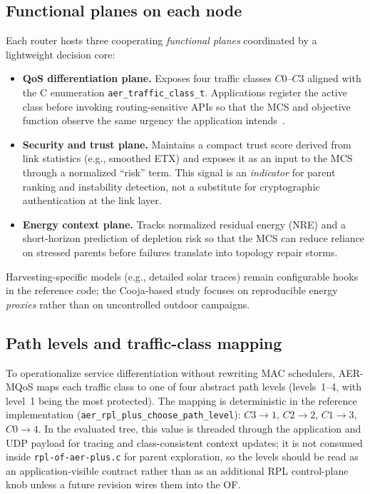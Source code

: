 \subsection{Functional planes on each node}
Each router hosts three cooperating \emph{functional planes} coordinated by a lightweight decision core:
\begingroup\sloppy
\begin{itemize}
  \item \textbf{QoS differentiation plane.} Exposes four traffic classes $C0$--$C3$ aligned with the C enumeration \texttt{aer\_traffic\_class\_t}. Applications register the active class before invoking routing-sensitive APIs so that the MCS and objective function observe the same urgency the application intends~\cite{rfc6551}.
  \item \textbf{Security and trust plane.} Maintains a compact trust score derived from link statistics (e.g., smoothed ETX) and exposes it as an input to the MCS through a normalized ``risk'' term. This signal is an \emph{indicator} for parent ranking and instability detection, not a substitute for cryptographic authentication at the link layer.
  \item \textbf{Energy context plane.} Tracks normalized residual energy (NRE) and a short-horizon prediction of depletion risk so that the MCS can reduce reliance on stressed parents before failures translate into topology repair storms.
\end{itemize}
\endgroup
Harvesting-specific models (e.g., detailed solar traces) remain configurable hooks in the reference code; the Cooja-based study focuses on reproducible energy \emph{proxies} rather than on uncontrolled outdoor campaigns.

\subsection{Path levels and traffic-class mapping}
\label{sec:arch-pathlevels}
To operationalize service differentiation without rewriting MAC schedulers, AER-MQoS maps each traffic class to one of four abstract path levels (levels~1--4, with level~1 being the most protected). The mapping is deterministic in the reference implementation (\texttt{aer\_rpl\_plus\_choose\_path\_level}): $C3\!\rightarrow\!1$, $C2\!\rightarrow\!2$, $C1\!\rightarrow\!3$, $C0\!\rightarrow\!4$. In the evaluated tree, this value is threaded through the application and UDP payload for tracing and class-consistent context updates; it is not consumed inside \texttt{rpl-of-aer-plus.c} for parent exploration, so the levels should be read as an application-visible contract rather than as an additional RPL control-plane knob unless a future revision wires them into the OF.

